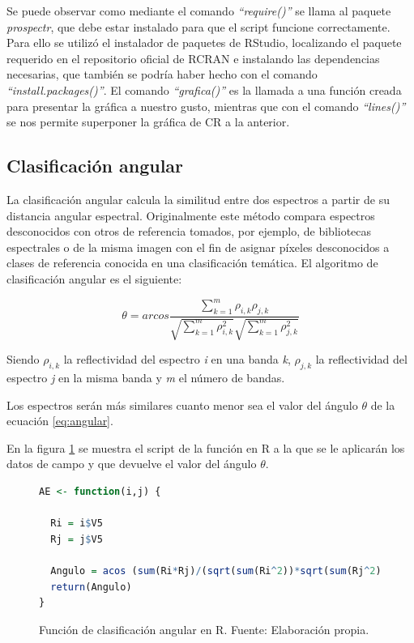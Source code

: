 Se puede observar como mediante el comando \textit{``require()''} se llama al paquete \textit{prospectr}, que debe estar instalado para que el script funcione correctamente. Para ello se utilizó el instalador de paquetes de RStudio, localizando el paquete requerido en el repositorio oficial de RCRAN e instalando las dependencias necesarias, que también se podría haber hecho con el comando \textit{``install.packages()''}. El comando \textit{``grafica()''} es la llamada a una función creada para presentar la gráfica a nuestro gusto, mientras que con el comando \textit{``lines()''} se nos permite superponer la gráfica de \ac{CR} a la anterior.

\subsection{Clasificación angular}
La clasificación angular calcula la similitud entre dos espectros a partir de su distancia angular espectral. Originalmente este método compara espectros desconocidos con otros de referencia tomados, por ejemplo, de bibliotecas espectrales o de la misma imagen \citep{girouard2004validated} con el fin de asignar píxeles desconocidos a clases de referencia conocida en una clasificación temática. El algoritmo de clasificación angular es el siguiente:

\begin{equation} \label{eq:angular}
	\theta = arcos \frac{\sum_{k=1}^{m} \rho_{i,k} \rho_{j,k}}{\sqrt{\sum_{k=1}^{m} \rho_{i,k}^{2}} \sqrt{\sum_{k=1}^{m} \rho_{j,k}^{2}}}
\end{equation}\Sep

Siendo $\rho_{i,k}$ la reflectividad del espectro \textit{i} en una banda \textit{k}, $\rho_{j,k}$ la reflectividad del espectro \textit{j} en la misma banda y \textit{m} el número de bandas.\Sep

Los espectros serán más similares cuanto menor sea el valor del ángulo $\theta$ de la ecuación \ref{eq:angular}.\Sep

En la figura \ref{fig:AE} se muestra el script de la función en R a la que se le aplicarán los datos de campo y que devuelve el valor del ángulo $\theta$.

\begin{figure}
\centering
\begin{lstlisting}[language = R, frame = single]
AE <- function(i,j) {
  
  Ri = i$V5
  Rj = j$V5

  Angulo = acos (sum(Ri*Rj)/(sqrt(sum(Ri^2))*sqrt(sum(Rj^2))))
  return(Angulo)
}
\end{lstlisting}
\caption[Función clasificación angular]{Función de clasificación angular en R. Fuente: Elaboración propia.}
\label{fig:AE}
\end{figure}

